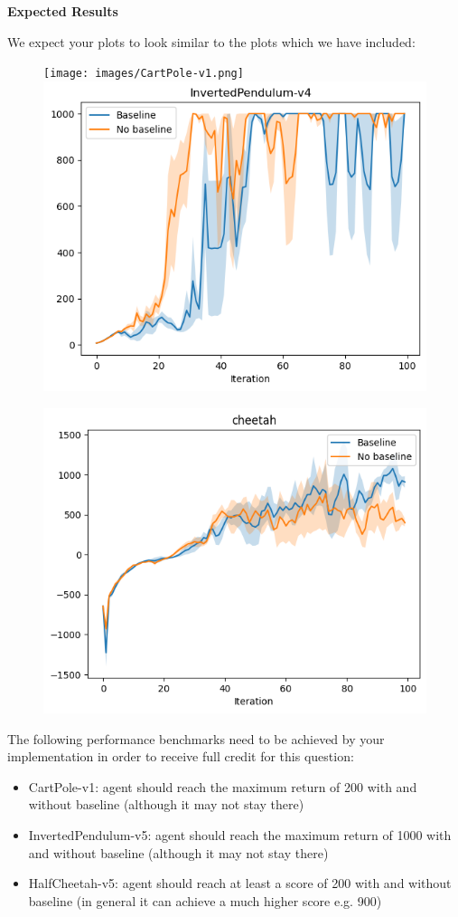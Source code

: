 \clearpage
\textbf{Expected Results}

We expect your plots to look similar to the plots which we have included:

\begin{figure}[H]
\centering
  \texttt{[image: images/CartPole-v1.png]}
  \includegraphics[width=.45\linewidth]{images/InvertedPendulum-v5.png}
\end{figure}

\begin{figure}[H]
\centering
  \includegraphics[width=.45\linewidth]{images/HalfCheetah-v5.png}
\end{figure}

The following performance benchmarks need to be achieved by your implementation in order to receive full credit for this question:

\begin{itemize}
	\item CartPole-v1: agent should reach the maximum return of 200 with and without baseline (although it may not stay there)
	\item InvertedPendulum-v5: agent should reach the maximum return of 1000 with and without baseline (although it may not stay there)
	\item HalfCheetah-v5: agent should reach at least a score of 200 with and without baseline (in general it can achieve a much higher score e.g. 900)
\end{itemize}
\clearpage

